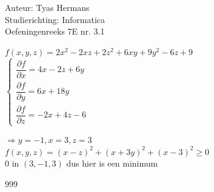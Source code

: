 \documentclass[a4paper]{article}
\begin{document}
  
\noindent \large Auteur: Tyas Hermans \\
\noindent \large Studierichting: Informatica\\
\noindent \large Oefeningenreeks 7E nr. 3.1 \\

\medskip

\normalsize

$f(x,y,z) = 2x^2-2xz +2z^2+6xy+9y^2-6z+9$\\

$\left\{
\begin{array}{l}
\dfrac{\partial f}{\partial x} = 4x -2z +6y\\
\dfrac{\partial f}{\partial y} = 6x + 18y\\
\dfrac{\partial f}{\partial z} = -2x +4z -6
\end{array}
\right.$

$\Rightarrow y = -1,x=3,z=3$\\

$f(x,y,z) = (x-z)^2+(x+3y)^2+(x-3)^2 \geq 0$\\

$0$ in $(3,-1,3)$ dus hier is een minimum\\



\begin{thebibliography}{999}
\end{thebibliography}
\end{document}
